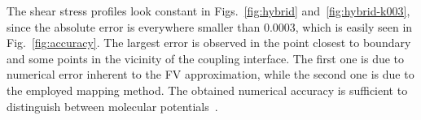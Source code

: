 \documentclass{elsarticle} %
\begin{document}
\begin{comment}
\begin{table}
    \centering
    \caption{
        Absolute numerical error of the shear stress obtained by the pure and hybrid schemes near \(y=0\).
    }\label{table:accuracy}
    \centering
    \begin{tabular}{|c|c|c|c|c|c|}\hline
        \(k\) & DVM & D3Q19 & D3Q96 & hybrid D3Q19 & hybrid D3Q96 \\\hline
        0.03 & -0.000022 & 0.00032 & 0.000020 & -0.0000030 & -0.000014 \\
        0.1  & -0.00010  & 0.0027  & 0.000012 &  0.000052  & -0.00022  \\\hline
    \end{tabular}
\end{table}
\end{comment}

The shear stress profiles look constant in Figs.~\ref{fig:hybrid} and~\ref{fig:hybrid-k003},
since the absolute error is everywhere smaller than 0.0003, which is easily seen in Fig.~\ref{fig:accuracy}.
The largest error is observed in the point closest to boundary and some points in the vicinity of the coupling interface.
The first one is due to numerical error inherent to the FV approximation,
while the second one is due to the employed mapping method.
The obtained numerical accuracy is sufficient to distinguish between molecular potentials~\cite{Sharipov2013, Su2018}.

\end{document}
